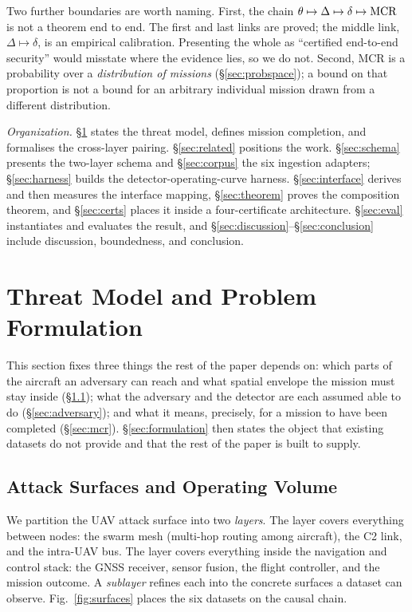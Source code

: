 Two further boundaries are worth naming. First, the chain
$\theta\mapsto\Delta\mapsto\delta\mapsto\mathrm{MCR}$ is not a theorem end to end. The
first and last links are proved; the middle link, $\Delta\mapsto\delta$, is an
empirical calibration. Presenting the whole as ``certified end-to-end security''
would misstate where the evidence lies, so we do not. Second, MCR is a
probability over a \emph{distribution of missions}
(\S\ref{sec:probspace}); a bound on that proportion is not a bound for an
arbitrary individual mission drawn from a different distribution.

\emph{Organization.}
\S\ref{sec:problem} states the threat model, defines mission completion, and
formalises the cross-layer pairing. \S\ref{sec:related} positions the work.
\S\ref{sec:schema} presents the two-layer schema and \S\ref{sec:corpus} the six
ingestion adapters; \S\ref{sec:harness} builds the detector-operating-curve
harness. \S\ref{sec:interface} derives and then measures the interface mapping,
\S\ref{sec:theorem} proves the composition theorem, and \S\ref{sec:certs}
places it inside a four-certificate architecture. \S\ref{sec:eval} instantiates
and evaluates the result, and
\S\ref{sec:discussion}--\S\ref{sec:conclusion} include discussion, boundedness, and conclusion. 

\section{Threat Model and Problem Formulation}
\label{sec:problem}
This section fixes three things the rest of the paper depends on: which parts of
the aircraft an adversary can reach and what spatial envelope the mission must
stay inside (\S\ref{sec:surfaces}); what the adversary and the detector are each
assumed able to do (\S\ref{sec:adversary}); and what it means, precisely, for a
mission to have been completed (\S\ref{sec:mcr}). \S\ref{sec:formulation} then
states the object that existing datasets do not provide and that the rest of the
paper is built to supply.

\subsection{Attack Surfaces and Operating Volume}
\label{sec:surfaces}
We partition the UAV attack surface into two \emph{layers}. The \layernet{}
layer covers everything between nodes: the swarm mesh (multi-hop routing among
aircraft), the C2 link, and the intra-UAV bus. The \layerauto{} layer covers
everything inside the navigation and control stack: the GNSS receiver, sensor
fusion, the flight controller, and the mission outcome. A \emph{sublayer}
refines each into the concrete surfaces a dataset can observe.
Fig.~\ref{fig:surfaces} places the six datasets on the causal chain.

